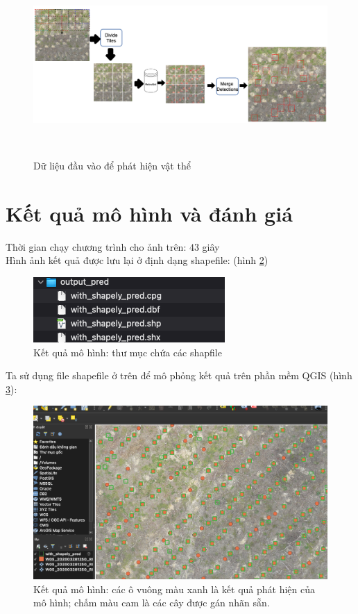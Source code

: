 \documentclass[a4paper, 12pt]{report}
\begin{document}
 \begin{figure}[!htb]
	\centering
	\includegraphics[width=1.1\linewidth, height=7cm]{Images/deploymentStage1}
	\caption{Dữ liệu đầu vào để phát hiện vật thể}
	\label{fig:deploymentStage}
\end{figure}

\section{Kết quả mô hình và đánh giá}
Thời gian chạy chương trình cho ảnh trên: $43$ giây \\
Hình ảnh kết quả được lưu lại ở định dạng shapefile: 	(hình \ref{fig:shpfile_demo_result})
 \begin{figure}[!h]
	\centering
	\includegraphics[width=0.5\linewidth]{Images/shpfile_demo_result}
	\caption{Kết quả mô hình: thư mục chứa các shapfile}
	\label{fig:shpfile_demo_result}
\end{figure}




Ta sử dụng file shapefile ở trên để mô phỏng kết quả trên phần mềm QGIS (hình \ref{fig:demo_result}): 
 \begin{figure}[!h]
	\centering
	\includegraphics[width=1\linewidth]{Images/demo_result}
	\caption{Kết quả mô hình: các ô vuông màu xanh là kết quả phát hiện của mô hình; chấm màu cam là các cây được gán nhãn sẵn. }
	\label{fig:demo_result}
\end{figure}
\end{document}
